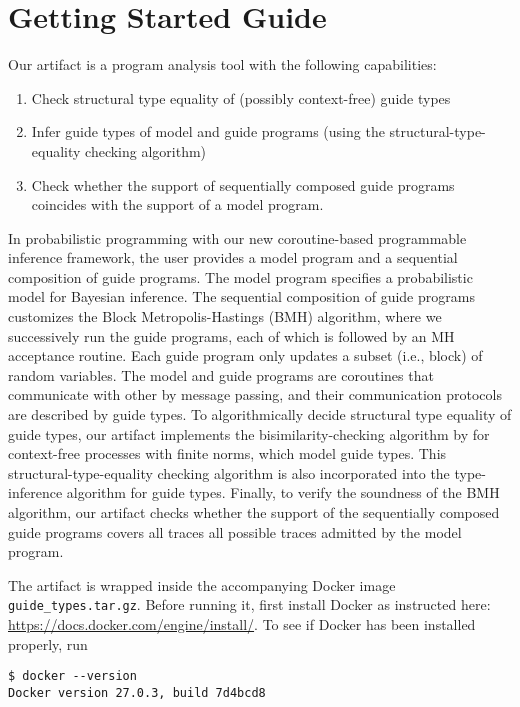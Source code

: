 
\section{Getting Started Guide}

Our artifact is a program analysis tool with the following capabilities:
\begin{enumerate}
  \item Check structural type equality of (possibly context-free) guide types
  \item Infer guide types of model and guide programs (using the
        structural-type-equality checking algorithm)
  \item Check whether the support of sequentially composed guide programs
        coincides with the support of a model program.
\end{enumerate}

In probabilistic programming with our new coroutine-based
programmable inference framework, the user provides a model program and a
sequential composition of guide programs.
%
The model program specifies a probabilistic model for Bayesian inference.
%
The sequential composition of guide programs customizes the Block
Metropolis-Hastings (BMH) algorithm, where we successively run the guide
programs, each of which is followed by an MH acceptance routine.
%
Each guide program only updates a subset (i.e., block) of random variables.
%
The model and guide programs are coroutines that communicate with other by
message passing, and their communication protocols are described by guide types.
%
To algorithmically decide structural type equality of guide types, our artifact
implements the bisimilarity-checking algorithm by \citet{Hirshfeld1994} for
context-free processes with finite norms, which model guide types.
%
This structural-type-equality checking algorithm is also incorporated into the
type-inference algorithm for guide types.
%
Finally, to verify the soundness of the BMH algorithm, our artifact checks
whether the support of the sequentially composed guide programs covers all
traces all possible traces admitted by the model program.

The artifact is wrapped inside the accompanying Docker image
\texttt{guide\_types.tar.gz}.
%
Before running it, first install Docker as instructed here:
\url{https://docs.docker.com/engine/install/}.
%
To see if Docker has been installed properly, run
\begin{verbatim}
$ docker --version
Docker version 27.0.3, build 7d4bcd8
\end{verbatim}


